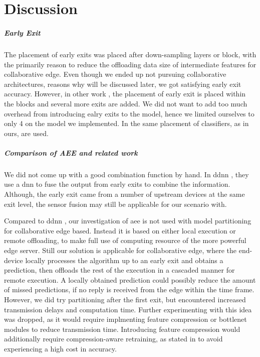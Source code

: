\hypertarget{discussion}{%
\chapter{Discussion}\label{ch:discussion}}
\thispagestyle{fancy}


\paragraph{Early Exit}
The placement of early exits was placed after down-sampling layers or block, with the primarily reason to reduce the offloading data size of intermediate features for collaborative edge. Even though we ended up not pursuing collaborative architectures, reasons why will be discussed later, we got satisfying early exit accuracy. However, in other work \cite{huang_multi-scale_2017}, the placement of early exit is placed within the blocks and several more exits are added. We did not want to add too much overhead from introducing ealry exits to the model, hence we limited ourselves to only 4 on the model we implemented. In \cite{berestizshevsky_sacrificing_2019} the same placement of classifiers, as in ours, are used.

\paragraph{Comparison of AEE and related work}

We did not come up with a good combination function by hand. In \gls{ddnn} \cite{teerapittayanon_distributed_2017}, they use a \gls{dnn} to fuse the output from  early exits to combine the information. Although, the early exit came from a number of upstream devices at the same exit level, the sensor fusion may still be applicable for our scenario with. 

Compared to \gls{ddnn} \cite{teerapittayanon_distributed_2017}, our investigation of \gls{aee} is not used with model partitioning for collaborative edge based. Instead it is based on either local execution or remote offloading, to make full use of computing resource of the more powerful edge server. Still our solution is applicable for collaborative edge, where the end-device locally processes the algorithm up to an early exit and obtains a prediction, then offloads the rest of the execution in a cascaded manner for remote execution. A locally obtained prediction could possibly reduce the amount of missed predictions, if no reply is received from the edge within the time frame. However, we did try partitioning after the first exit, but encountered increased transmission delays and computation time. Further experimenting with this idea was dropped, as it would require implmenting feature compression or \gls{bottlenet} modules to reduce transmission time. Introducing feature compression would additionally require compression-aware retraining, as stated in \cite{choi_near-lossless_2018,choi_near-lossless_2018,eshratifar_bottlenet:_2019}  to avoid experiencing a high cost in accuracy.

